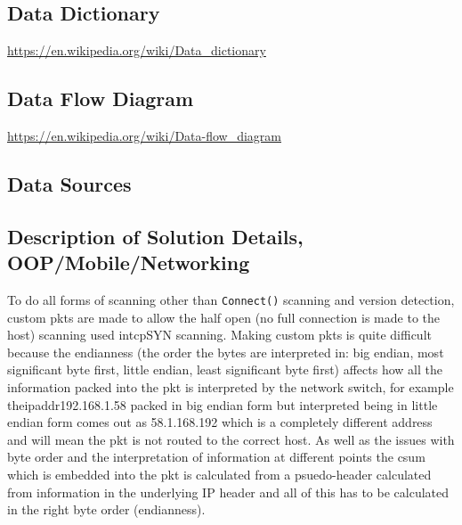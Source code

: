 \documentclass[titlepage]{article}
\let\Oldsubsection\subsection{}
\renewcommand{\subsection}{\FloatBarrier\Oldsubsection}
\begin{document}
\subsection{Data Dictionary}

\textbf{\color{red}{I looked this up and it seemed to be related to database management systems.}}

\href{https://en.wikipedia.org/wiki/Data_dictionary}{https://en.wikipedia.org/wiki/Data\_dictionary}

\subsection{Data Flow Diagram}

\textbf{\color{red}{This seems to be fairly relevant and to do with how data goes through my program
    i.e.\ going from the network to my port scanner into a target object and other scanners
before version detection and finally displaying to the user. Make a flowchart for this.}}

\href{https://en.wikipedia.org/wiki/Data-flow_diagram<Paste>}{https://en.wikipedia.org/wiki/Data-flow\_diagram}

\subsection{Data Sources}

\textbf{\color{red}{Not really sure about this.}}

\subsection{Description of Solution Details, OOP/Mobile/Networking}

To do all forms of scanning other than \verb|Connect()| scanning and version detection, custom
\glspl{pkt} are made to allow the \gls{half open} (no full connection is made to the host) scanning
used in\gls{tcp}SYN scanning. Making custom \glspl{pkt} is quite difficult because the endianness
(the order the bytes are interpreted in: big endian, most significant byte first, little endian,
least significant byte first) affects how all the information packed into the \gls{pkt} is interpreted
by the network switch, for example the\gls{ipaddr}192.168.1.58 packed in big endian form but interpreted
being in little endian form comes out as 58.1.168.192 which is a completely different address and
will mean the \gls{pkt} is not routed to the correct host. As well as the issues with byte order
and the interpretation of information at different points the \gls{csum} which is embedded into
the \gls{pkt} is calculated from a psuedo-header calculated from information in the underlying
IP \gls{header} and all of this has to be calculated in the right byte order (endianness).
\end{document}
